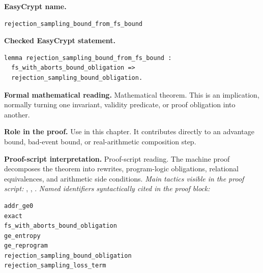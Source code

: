 \begin{formaltheorem}
\noindent\textbf{EasyCrypt name.}
\begin{lstlisting}[language=EasyCrypt,basicstyle=\ttfamily\scriptsize]
rejection_sampling_bound_from_fs_bound
\end{lstlisting}
\noindent\textbf{Checked EasyCrypt statement.}
\begin{lstlisting}[language=EasyCrypt,basicstyle=\ttfamily\scriptsize]
lemma rejection_sampling_bound_from_fs_bound :
  fs_with_aborts_bound_obligation =>
  rejection_sampling_bound_obligation.
\end{lstlisting}
\noindent\textbf{Formal mathematical reading.}
Mathematical theorem. This is an implication, normally turning one invariant, validity predicate, or proof obligation into another.

\noindent\textbf{Role in the proof.}
Use in this chapter. It contributes directly to an advantage bound, bad-event bound, or real-arithmetic composition step.

\noindent\textbf{Proof-script interpretation.}
Proof-script reading. The machine proof decomposes the theorem into rewrites, program-logic obligations, relational equivalences, and arithmetic side conditions.
\emph{Main tactics visible in the proof script:} , , .
\emph{Named identifiers syntactically cited in the proof block:}
\begin{lstlisting}[language=EasyCrypt,basicstyle=\ttfamily\scriptsize]
addr_ge0
exact
fs_with_aborts_bound_obligation
ge_entropy
ge_reprogram
rejection_sampling_bound_obligation
rejection_sampling_loss_term
\end{lstlisting}

\end{formaltheorem}

